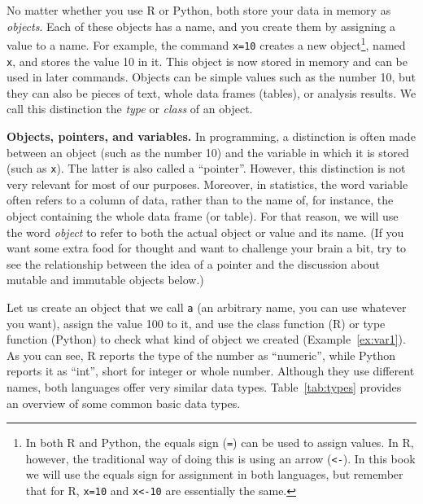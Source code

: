 No matter whether you use R or Python, both store your data in memory as \emph{objects}.
Each of these objects has a name, and you create them by
assigning a value to a name. For example, the command \verb|x=10|
creates a new object\footnote{In both R and Python, the equals
  sign (\verb|=|) can be used to assign values. In R, however, the
  traditional way of doing this is using an arrow (\verb|<-|). In
  this book we will use the equals sign for assignment in both
  languages, but remember that for R, \verb|x=10| and
  \verb|x<-10| are essentially the same.}, named \texttt{x}, and stores the value 10
in it.  This object is now stored in memory and can be used in later
commands. Objects can be simple values such as the number 10, but they can also
be pieces of text, whole data frames (tables), or analysis results.
We call this distinction the \emph{type} or \emph{class} of an
object. 

\begin{feature}
\textbf{Objects, pointers, and variables.} In programming, a distinction is
  often made between an object (such as the number 10) and the
  variable in which it is stored (such as \texttt{x}). The latter is also called a ``pointer''.
  However, this distinction is not very relevant for most of our
  purposes. Moreover, in statistics, the word variable often refers to a
  column of data, rather than to the name of, for instance, the object
  containing the whole data frame (or table).  For that
  reason, we will use the word \emph{object} to refer to both the
  actual object or value and its name. (If you want some extra food
  for thought and want to challenge your brain
  a bit, try to see the relationship between the idea of a pointer and
  the discussion about mutable and immutable objects below.)
\end{feature}

Let us create an object that we call \verb|a| (an arbitrary name, you can use
whatever you want), assign the value 100 to it, and use the class
function (R) or type function (Python) to check what kind of
object we created (Example~\ref{ex:var1}).
As you can see, R reports the type of the number as ``numeric'', while Python reports it
as ``int'', short for integer or whole number.  Although they use
different names, both languages offer very similar data types.
Table~\ref{tab:types} provides an overview of some common basic data types.


